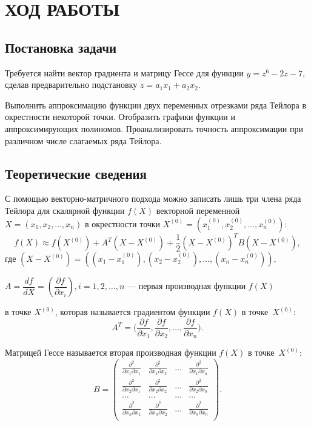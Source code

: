 \section{ХОД РАБОТЫ}

\subsection{Постановка задачи}

Требуется найти вектор градиента и матрицу Гессе для функции $y = z^6 - 2z - 7$,
сделав предварительно подстановку $z = a_1x_1 + a_2x_2$.

Выполнить аппроксимацию функции двух переменных отрезками ряда Тейлора
в окрестности некоторой точки. Отобразить графики функции и аппроксимирующих
полиномов. Проанализировать точность аппроксимации при различном числе
слагаемых ряда Тейлора.


\subsection{Теоретические сведения}
\label{sub:theory}

С помощью векторно-матричного подхода можно записать лишь три члена
ряда Тейлора для скалярной функции $f(X)$ векторной переменной
$X = (x_1, x_2, \dots, x_n)$ в окрестности
точки $X^{(0)} = (x_1^{(0)}, x_2^{(0)}, \dots, x_n^{(0)})$:
\begin{equation*}
  f(X) \approx f(X^{(0)}) + A^T (X-X^{(0)}) + \dfrac{1}{2} (X-X^{(0)})^T B(X-X^{(0)}),
\end{equation*}
где \hspace{1.5mm}  $(X-X^{(0)}) = ((x_1 - x_1^{(0)}), (x_2 - x_2^{(0)}), \dots, (x_n - x_n^{(0)})), $ \par
                  $A = \dfrac{df}{dX} = (\dfrac{\partial f}{\partial x_i}), i = 1,2,\dots,n$ ---
                  первая производная функции $f(X)$ \par 
                  в точке $X^{(0)}$, которая называется градиентом функции $f(X)$ в точке~$X^{(0)}$:
\begin{equation*}
  A^T = \bigg( \dfrac{\partial f}{\partial x_1}, \dfrac{\partial f}{\partial x_2}, \dots, \dfrac{\partial f}{\partial x_n} \bigg).
\end{equation*}

Матрицей Гессе называется вторая производная функции $f(X)$ в точке~$X^{(0)}$:
\[
  B =
    \left(
      \begin{array}{cccc}
        \frac{\partial^2}{\partial x_1 \partial x_1} & \frac{\partial^2}{\partial x_1 \partial x_2} & \dots & \frac{\partial^2}{\partial x_1 \partial x_n} \\
        \frac{\partial^2}{\partial x_2 \partial x_1} & \frac{\partial^2}{\partial x_2 \partial x_2} & \dots & \frac{\partial^2}{\partial x_2 \partial x_n} \\
        \dots & \dots & \dots & \dots \\
        \frac{\partial^2}{\partial x_n \partial x_1} & \frac{\partial^2}{\partial x_n \partial x_2} & \dots & \frac{\partial^2}{\partial x_n \partial x_n} \\
      \end{array}
    \right).
\]

